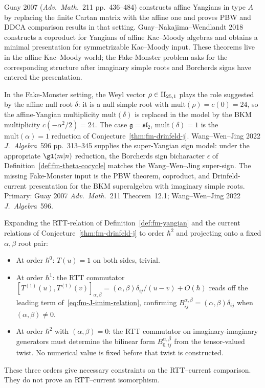\begin{proposition}
\label{ver:fm-J-path-v}
Guay 2007 (\emph{Adv.~Math.}~211 pp.~436--484) constructs affine Yangians in type $A$ by replacing the finite Cartan matrix with the affine one and proves PBW and DDCA comparison results in that setting. Guay--Nakajima--Wendlandt 2018 constructs a coproduct for Yangians of affine Kac--Moody algebras and obtains a minimal presentation for symmetrizable Kac--Moody input. These theorems live in the affine Kac--Moody world; the Fake-Monster problem asks for the corresponding structure after imaginary simple roots and Borcherds signs have entered the presentation.

In the Fake-Monster setting, the Weyl vector $\rho \in \mathrm{II}_{25,1}$ plays the role suggested by the affine null root $\delta$: it is a null simple root with $\mathrm{mult}(\rho) = c(0) = 24$, so the affine-Yangian multiplicity $\mathrm{mult}(\delta)$ is replaced in the model by the BKM multiplicity $c(-\alpha^2/2) = 24$. The case $\mathfrak{g} = \mathfrak{sl}_2$, $\mathrm{mult}(\delta) = 1$ is the $\mathrm{mult}(\alpha) = 1$ reduction of Conjecture~\ref{thm:fm-drinfeld-j}. Wang--Wen--Jing 2022 \emph{J.~Algebra}~596 pp.~313--345 supplies the super-Yangian sign model: under the appropriate $\gl(m|n)$ reduction, the Borcherds sign bicharacter $\epsilon$ of Definition~\ref{def:fm-theta-cocycle} matches the Wang--Wen--Jing super-sign. The missing Fake-Monster input is the PBW theorem, coproduct, and Drinfeld-current presentation for the BKM superalgebra with imaginary simple roots.
Primary: Guay 2007 \emph{Adv.~Math.}~211 Theorem~12.1; Wang--Wen--Jing 2022 \emph{J.~Algebra}~596.
\end{proposition}

\begin{proposition}
\label{ver:fm-J-path-vi}
Expanding the RTT-relation of Definition~\ref{def:fm-yangian} and the current relations of Conjecture~\ref{thm:fm-drinfeld-j} to order $\hbar^2$ and projecting onto a fixed $\alpha, \beta$ root pair:
\begin{itemize}
\item At order $\hbar^0$: $T(u) = 1$ on both sides, trivial.
\item At order $\hbar^1$: the RTT commutator $[T^{(1)}(u), T^{(1)}(v)]_{\alpha, \beta} = (\alpha, \beta) \delta_{ij}/(u-v) + O(\hbar)$ reads off the leading term of~\eqref{eq:fm-J-imim-relation}, confirming $B^{\alpha, \beta}_{ij} = (\alpha, \beta) \delta_{ij}$ when $(\alpha, \beta) \neq 0$.
\item At order $\hbar^2$ with $(\alpha, \beta) = 0$: the RTT commutator on imaginary-imaginary generators must determine the bilinear form $B^{\alpha,\beta}_{0,ij}$ from the tensor-valued twist. No numerical value is fixed before that twist is constructed.
\end{itemize}
These three orders give necessary constraints on the RTT--current
comparison. They do not prove an RTT--current isomorphism.
\end{proposition}

